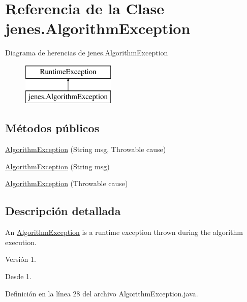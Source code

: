 \hypertarget{classjenes_1_1_algorithm_exception}{\section{Referencia de la Clase jenes.\-Algorithm\-Exception}
\label{classjenes_1_1_algorithm_exception}
}
Diagrama de herencias de jenes.\-Algorithm\-Exception\begin{figure}[H]
\begin{center}
\leavevmode
\includegraphics[height=2.000000cm]{classjenes_1_1_algorithm_exception}
\end{center}
\end{figure}
\subsection*{Métodos públicos}
\begin{DoxyCompactItemize}
\item 
\hyperlink{classjenes_1_1_algorithm_exception_aa53d271c0db7099eb6fc52c288e05eb0}{Algorithm\-Exception} (String msg, Throwable cause)
\item 
\hyperlink{classjenes_1_1_algorithm_exception_a295c243603f7b36f9ab5b0e1ec22aa60}{Algorithm\-Exception} (String msg)
\item 
\hyperlink{classjenes_1_1_algorithm_exception_ad6906756121d65db53ece1c1d9d8d0db}{Algorithm\-Exception} (Throwable cause)
\end{DoxyCompactItemize}


\subsection{Descripción detallada}
An {\ttfamily \hyperlink{classjenes_1_1_algorithm_exception}{Algorithm\-Exception}} is a runtime exception thrown during the algorithm execution.

\begin{DoxyVersion}{Versión}
1. 
\end{DoxyVersion}
\begin{DoxySince}{Desde}
1. 
\end{DoxySince}


Definición en la línea 28 del archivo Algorithm\-Exception.\-java.



